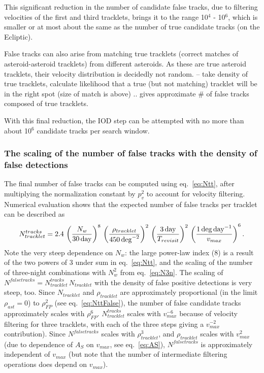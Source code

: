 This significant reduction in the number of candidate false tracks, due to filtering velocities
of the first and third tracklets, brings it to the range 10$^{4}$ - 10$^{6}$, which is smaller or at
most about the same as the number of true candidate tracks (on the Ecliptic). 

False tracks can also arise from matching true tracklets (correct matches of 
asteroid-asteroid tracklets) from different asteroids. As these are true asteroid tracklets,
their velocity distribution is decidedly not random. 
-- take density of true tracklets, calculate likelihood that a true (but not matching) tracklet will
be in the right spot (size of match is above) .. gives approximate # of false tracks composed of true tracklets.


With this final
reduction, the IOD step can be attempted with no more than about 10$^6$ candidate tracks per
search window.



\subsubsection{The scaling of the number of false tracks with the density of false detections}

The final number of false tracks can be computed using eq.~\ref{eq:Ntt}, after multiplying
the normalization constant by $p_v^2$ to account for velocity filtering. Numerical evaluation
shows that the expected number of false tracks per tracklet can be described as
\begin{equation}
\label{eq:NttFinalFit}
   N_{tracklet}^{tracks} = 2.4 \, \left({N_w\over 30\, {\rm day}}\right)^8 \, \left( \rho_{tracklet}  \over 450
        \, {\rm deg}^{-2} \right)^2 \, \left( {3\,{\rm day} \over T_{revisit}} \right)^2 \,
         \left( {1 \, {\rm deg} \, {\rm day}^{-1}  \over  v_{max} }\right)^6.
\end{equation}
Note the very steep dependence on $N_w$: the large power-law index (8) is a result of the two
powers of 3 under sum in eq.~\ref{eq:Ntt}, and the scaling of the number of three-night
combinations with $N_w^2$ from eq.~\ref{eq:N3n}. The scaling of $N^{falsetracks} = N_{tracklet}^{tracks} \, N_{tracklet}$
with the density of false positive detections is very steep, too. Since $N_{tracklet}$ and $\rho_{tracklet}$
are approximately proportional (in the limit $\rho_{ast}=0$) to $\rho_{FP}^2$ (see eq.~\ref{eq:NttFalse}),
the number of false candidate tracks approximately scales with $\rho_{FP}^6$. 
$N_{tracklet}^{tracks}$ scales with $v_{max}^{-6}$ because of velocity filtering for three tracklets,
with each of the three steps giving a $v_{max}^{-2}$ contribution). 
Since $N^{falsetracks}$ scales with $\rho_{tracklet}^3$, and $\rho_{tracklet}$ scales with $v_{max}^2$
(due to dependence of $A_S$ on $v_{max}$, see eq.~\ref{eq:AS}), $N^{falsetracks}$ is approximately 
independent of $v_{max}$ (but note that the number of intermediate filtering operations does 
depend on $v_{max}$). 

